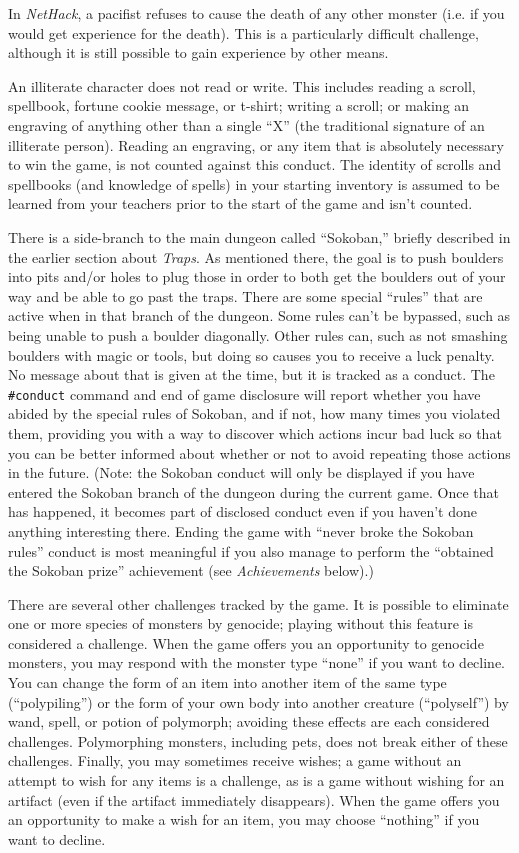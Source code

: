 \documentclass[titlepage]{article}
\begin{document}
In \textit{NetHack}, a pacifist refuses to cause the death of any other monster
(i.e. if you would get experience for the death).  This is a particularly
difficult challenge, although it is still possible to gain experience
by other means.

An illiterate character does not read or write.  This includes reading
a scroll, spellbook, fortune cookie message, or t-shirt; writing a
scroll; or making an engraving of anything other than a single ``X'' (the
traditional signature of an illiterate person).  Reading an engraving,
or any item that is absolutely necessary to win the game, is not counted
against this conduct.  The identity of scrolls and spellbooks (and
knowledge of spells) in your starting inventory is assumed to be
learned from your teachers prior to the start of the game and isn't
counted.

There is a side-branch to the main dungeon called ``Sokoban,'' briefly
described in the earlier section about \textit{Traps}.
As mentioned there, the goal is to push boulders into pits and/or holes
to plug those in order to both get the boulders out of your way and be
able to go past the traps.
There are some special ``rules'' that are active when in that branch
of the dungeon.
Some rules can't be bypassed, such as being unable to push a boulder
diagonally.
Other rules can, such as not smashing boulders with magic or tools,
but doing so causes you to receive a luck penalty.
No message about that is given at the time, but it is tracked as a conduct.
The \texttt{\#conduct} command and end of game disclosure will report whether
you have abided by the special rules of Sokoban, and if not, how many
times you violated them, providing you with a way to discover which
actions incur bad luck so that you can be better informed about whether
or not to avoid repeating those actions in the future.
(Note:  the Sokoban conduct will only be displayed if you have
entered the Sokoban branch of the dungeon during the current game.
Once that has happened, it becomes part of disclosed conduct even if
you haven't done anything interesting there.
Ending the game with ``never broke the Sokoban rules'' conduct is most
meaningful if you also manage to perform
the ``obtained the Sokoban prize'' achievement
(see \textit{Achievements} below).)

There are several other challenges tracked by the game.  It is possible
to eliminate one or more species of monsters by genocide; playing without
this feature is considered a challenge.  When the game offers you an
opportunity to genocide monsters, you may respond with the monster type
``none'' if you want to decline.  You can change the form of an item into
another item of the same type (``polypiling'') or the form of your own
body into another creature (``polyself'') by wand, spell, or potion of
polymorph; avoiding these effects are each considered challenges.
Polymorphing monsters, including pets, does not break either of these
challenges.
Finally, you may sometimes receive wishes; a game without an attempt to
wish for any items is a challenge, as is a game without wishing for
an artifact (even if the artifact immediately disappears).  When the
game offers you an opportunity to make a wish for an item, you may
choose ``nothing'' if you want to decline.
\end{document}
